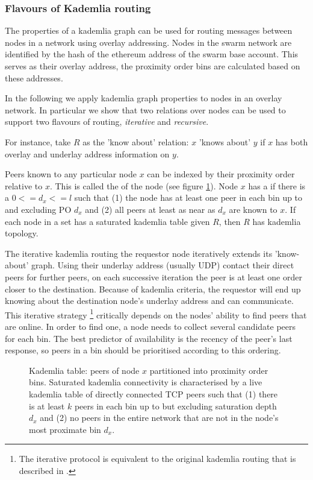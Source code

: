 \subsubsection{Flavours of Kademlia routing}
\label{sec:kademlia} 

The properties of a kademlia graph can be used for routing messages between nodes in a network using overlay addressing. Nodes in the swarm network are identified by the hash of the ethereum address of the swarm base account. This serves as their overlay address, the proximity order bins are calculated based on these addresses. 

In the following we apply kademlia graph properties to nodes in an overlay network. In particular we show that two relations over nodes can be used to support two flavours of routing, \emph{iterative} and \emph{recursive}.


For instance, take $R$ as the 'know about' relation:
$x$ 'knows about' $y$ if $x$ has both overlay and underlay address information on $y$. 


Peers known to any particular node $x$ can be indexed by their proximity order relative to $x$. This is called the  of the node (see figure \ref{fig:kademliatable}). 
Node $x$ has a  if there is a $0<=d_x<=l$ such that (1) the node has at least one peer in each bin up to and excluding PO $d_x$ and (2) all peers at least as near as $d_x$ are known to $x$. 
If each node in a set has a saturated kademlia table given $R$, then $R$ has kademlia topology.


The iterative kademlia routing the requestor node iteratively extends its 'know-about' graph. Using their underlay address (usually UDP) contact their direct peers for further peers, on each successive iteration the peer is at least one order closer to the destination. Because of kademlia criteria, the requestor will end up knowing about the destination node's underlay address and can communicate. This iterative strategy%
%
\footnote{The iterative protocol is equivalent to   the original kademlia routing that is described in \cite{maymounkov2002kademlia}.
}
%
critically depends on the nodes' ability to find peers that are online. In order to find one, a node needs to collect several candidate peers for each bin. The best predictor of availability is the recency of the peer's last response, so peers in a bin should be prioritised according to this ordering.




\begin{figure}[htbp]
   \centering
   \caption{Kademlia table:  peers of node $x$ partitioned into proximity order bins. Saturated kademlia connectivity is 
   characterised by a live kademlia table of directly connected TCP peers such that (1) there is at least $k$ peers in each bin up to but excluding saturation depth $d_x$ and (2) no peers in the entire network that are not in the node's most proximate bin $d_x$. }
   \label{fig:kademliatable}
\end{figure}

